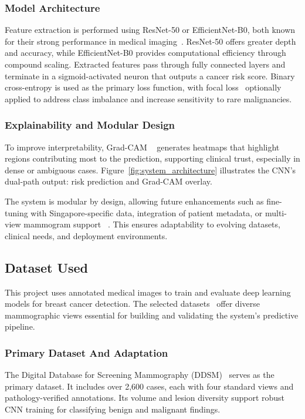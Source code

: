 \documentclass[12pt]{article}
\begin{document}
\subsubsection{Model Architecture}
Feature extraction is performed using ResNet-50 or EfficientNet-B0, both known for their strong performance in medical imaging~\cite{1,7}. ResNet-50 offers greater depth and accuracy, while EfficientNet-B0 provides computational efficiency through compound scaling.
Extracted features pass through fully connected layers and terminate in a sigmoid-activated neuron that outputs a cancer risk score. Binary cross-entropy is used as the primary loss function, with focal loss~\cite{2} optionally applied to address class imbalance and increase sensitivity to rare malignancies.

\subsubsection{Explainability and Modular Design}
To improve interpretability, Grad-CAM ~\cite{5} generates heatmaps that highlight regions
contributing most to the prediction, supporting clinical trust, especially in dense or ambiguous cases. Figure~\ref{fig:system_architecture} illustrates the CNN’s dual-path output: risk prediction and
Grad-CAM overlay.

The system is modular by design, allowing future enhancements such as fine-tuning
with Singapore-specific data, integration of patient metadata, or multi-view mammogram
support ~\cite{8}. This ensures adaptability to evolving datasets, clinical needs, and deployment
environments.

\subsection{Dataset Used}
\label{sec:dataset}

This project uses annotated medical images to train and evaluate deep learning models for breast cancer detection. The selected datasets~\cite{cbis_ddsm_kaggle} offer diverse mammographic views essential for building and validating the system’s predictive pipeline.

\subsubsection{Primary Dataset And Adaptation}
The Digital Database for Screening Mammography (DDSM)~\cite{18} serves as the primary dataset. It includes over 2,600 cases, each with four standard views and pathology-verified annotations. Its volume and lesion diversity support robust CNN training for classifying benign and malignant findings.
\end{document}
